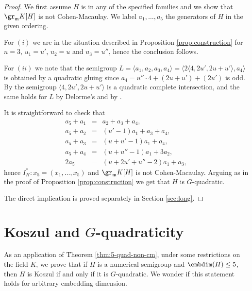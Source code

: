 \documentclass[12pt]{amsart}
\def\frk{\mathfrak}               %
\def\mm{{\frk m}}
\begin{document}
\begin{proof}
We first assume $H$ is in any of the specified families and we show that $\gr_\mm K[H]$ is not Cohen-Macaulay.
We label $a_1,\dots, a_5$ the  generators  of $H$ in the given ordering.

For $(i)$ we are in the situation described in Proposition \ref{prop:construction} for $n=3$, $u_1= u'$, $u_2=u$ and $u_3=u''$, 
hence the conclusion follows.

For $(ii)$ we note that the semigroup $L=\langle a_1, a_2, a_3, a_4\rangle = \langle 2 \langle 4, 2u', 2u+u'\rangle, a_4 \rangle$ 
is obtained by a quadratic gluing since $a_4=u''\cdot 4+(2u+u')+ (2u')$ is odd. 
By \cite[Proposition 3.6]{HeS-quad} the semigroup $\langle 4, 2u', 2u+u' \rangle$ is a quadratic complete intersection, 
and the same holds for $L$ by Delorme's \cite[Proposition 9]{Delorme}  and by
\cite[Corollary 2.7]{HeS-quad}. 

It is straightforward to check that 
\begin{eqnarray*}
a_5+a_1 &=& a_2+a_3+a_4,\\
a_5+ a_2 &=& (u'-1)a_1+ a_3+a_4,\\
a_5+ a_3 &=& (u+u'-1)a_1+ a_4,\\
a_5+ a_4 &=& (u+u''-1) a_1 + 3 a_2,\\
2 a_5 &=& (u+2u'+u''-2) a_1 + a_3,
\end{eqnarray*}
hence $I^*_H:x_5=(x_1, \dots, x_5)$ and $\gr_\mm K[H]$ is not Cohen-Macaulay.
 Arguing as in the proof of Proposition \ref{prop:construction} we get that $H$ is $G$-quadratic.

The direct implication is  proved separately in Section \ref{sec:long}.
\end{proof}




\section{Koszul and $G$-quadraticity}
\label{sec:g-quadratic}

As an application of Theorem \ref{thm:5-quad-non-cm}, under some   restrictions on the field $K$, we prove that if $H$ is a   numerical semigroup and $\embdim(H) \leq 5$, then
$H$ is Koszul if and only if it is $G$-quadratic. 
We wonder if this statement holds for arbitrary embedding dimension.
\end{document}
